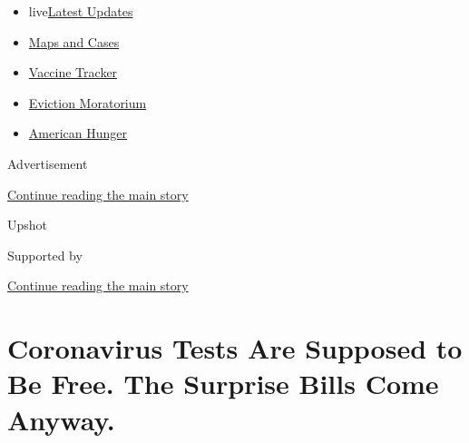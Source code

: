 \begin{itemize}
\tightlist
\item
  live\href{https://www.nytimes3xbfgragh.onion/2020/09/09/world/covid-19-coronavirus.html?name=styln-coronavirus-national\&region=TOP_BANNER\&block=storyline_menu_recirc\&action=click\&pgtype=Article\&impression_id=819d9280-f2a3-11ea-8800-53e543aa1720\&variant=undefined}{Latest
  Updates}
\item
  \href{https://www.nytimes3xbfgragh.onion/interactive/2020/us/coronavirus-us-cases.html?name=styln-coronavirus-national\&region=TOP_BANNER\&block=storyline_menu_recirc\&action=click\&pgtype=Article\&impression_id=819d9281-f2a3-11ea-8800-53e543aa1720\&variant=undefined}{Maps
  and Cases}
\item
  \href{https://www.nytimes3xbfgragh.onion/interactive/2020/science/coronavirus-vaccine-tracker.html?name=styln-coronavirus-national\&region=TOP_BANNER\&block=storyline_menu_recirc\&action=click\&pgtype=Article\&impression_id=819d9282-f2a3-11ea-8800-53e543aa1720\&variant=undefined}{Vaccine
  Tracker}
\item
  \href{https://www.nytimes3xbfgragh.onion/2020/09/02/your-money/eviction-moratorium-covid.html?name=styln-coronavirus-national\&region=TOP_BANNER\&block=storyline_menu_recirc\&action=click\&pgtype=Article\&impression_id=819d9283-f2a3-11ea-8800-53e543aa1720\&variant=undefined}{Eviction
  Moratorium}
\item
  \href{https://www.nytimes3xbfgragh.onion/interactive/2020/09/02/magazine/food-insecurity-hunger-us.html?name=styln-coronavirus-national\&region=TOP_BANNER\&block=storyline_menu_recirc\&action=click\&pgtype=Article\&impression_id=819d9284-f2a3-11ea-8800-53e543aa1720\&variant=undefined}{American
  Hunger}
\end{itemize}

Advertisement

\protect\hyperlink{after-top}{Continue reading the main story}

Upshot

Supported by

\protect\hyperlink{after-sponsor}{Continue reading the main story}

\hypertarget{coronavirus-tests-are-supposed-to-be-free-the-surprise-bills-come-anyway}{%
\section{Coronavirus Tests Are Supposed to Be Free. The Surprise Bills
Come
Anyway.}\label{coronavirus-tests-are-supposed-to-be-free-the-surprise-bills-come-anyway}}

